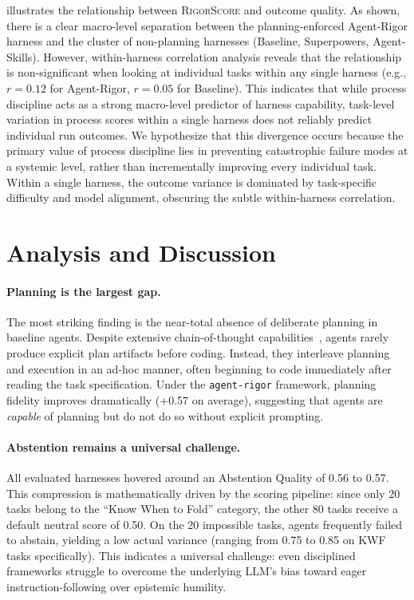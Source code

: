 \documentclass[letterpaper, 10 pt, conference]{ieeeconf}
\newcommand{\rigor}{\texttt{agent-rigor}}
\newcommand{\rigorscore}{\textsc{RigorScore}}
\begin{document}
   illustrates the relationship between \rigorscore{} and outcome quality. As shown, there is a clear macro-level separation between the planning-enforced Agent-Rigor harness and the cluster of non-planning harnesses (Baseline, Superpowers, Agent-Skills). However, within-harness correlation analysis reveals that the relationship is non-significant when looking at individual tasks within any single harness (e.g., $r = 0.12$ for Agent-Rigor, $r = 0.05$ for Baseline). This indicates that while process discipline acts as a strong macro-level predictor of harness capability, task-level variation in process scores within a single harness does not reliably predict individual run outcomes. We hypothesize that this divergence occurs because the primary value of process discipline lies in preventing catastrophic failure modes at a systemic level, rather than incrementally improving every individual task. Within a single harness, the outcome variance is dominated by task-specific difficulty and model alignment, obscuring the subtle within-harness correlation.

\section{Analysis and Discussion}
\label{sec:discussion}

\paragraph{Planning is the largest gap.}
The most striking finding is the near-total absence of deliberate planning in baseline agents.
Despite extensive chain-of-thought capabilities~\cite{wei2022chain,wang2024planning}, agents rarely produce explicit plan artifacts before coding.
Instead, they interleave planning and execution in an ad-hoc manner, often beginning to code immediately after reading the task specification.
Under the \rigor{} framework, planning fidelity improves dramatically (+0.57 on average), suggesting that agents are \emph{capable} of planning but do not do so without explicit prompting.

\paragraph{Abstention remains a universal challenge.}
All evaluated harnesses hovered around an Abstention Quality of 0.56 to 0.57. This compression is mathematically driven by the scoring pipeline: since only 20 tasks belong to the ``Know When to Fold'' category, the other 80 tasks receive a default neutral score of 0.50. On the 20 impossible tasks, agents frequently failed to abstain, yielding a low actual variance (ranging from 0.75 to 0.85 on KWF tasks specifically). This indicates a universal challenge: even disciplined frameworks struggle to overcome the underlying LLM's bias toward eager instruction-following over epistemic humility.
\end{document}
